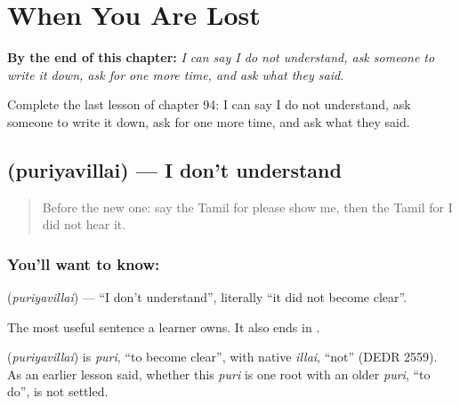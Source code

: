 
\chapter{When You Are Lost}
\label{ch:ta-when-you-are-lost}

\begin{chapteropening}
\textbf{By the end of this chapter:} \emph{I can say I do not understand, ask someone to write it down, ask for one more time, and ask what they said.}

Complete the last lesson of chapter 94: I can say I do not understand, ask someone to write it down, ask for one more time, and ask what they said.
\end{chapteropening}

\section[\texorpdfstring{\ta{புரியவில்லை} (puriyavillai)}{புரியவில்லை (puriyavillai)}]{ (puriyavillai) — I don't understand}

\label{lesson:TA-C94-dontunderstand}



\begin{quote}
Before the new one: say the Tamil for please show me, then the Tamil for I did not hear it.
\end{quote}

\subsection*{You'll want to know: }
\textbf{} (\emph{puriyavillai}) — \textquotedblleft{}I don't understand\textquotedblright{}, literally \textquotedblleft{}it did not become clear\textquotedblright{}.

The most useful sentence a learner owns. It also ends in \textbf{}.

\begin{cousinweb}
\textbf{} (\emph{puriyavillai}) is \emph{puri}, \textquotedblleft{}to become clear\textquotedblright{}, with native \emph{illai}, \textquotedblleft{}not\textquotedblright{} (DEDR 2559). As an earlier lesson said, whether this \emph{puri} is one root with an older \emph{puri}, \textquotedblleft{}to do\textquotedblright{}, is not settled.
\end{cousinweb}

